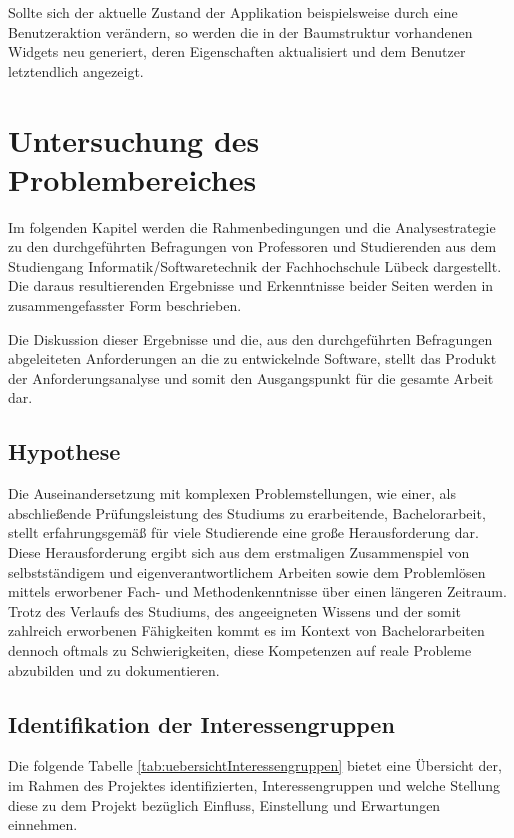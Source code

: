 \documentclass[bibliography=totoc,listof=totoc,BCOR=5mm,DIV=12,oneside]{scrbook}
\begin{document}
\par Sollte sich der aktuelle Zustand der Applikation beispielsweise durch eine Benutzeraktion verändern, so werden die in der Baumstruktur vorhandenen Widgets neu generiert, deren Eigenschaften aktualisiert und dem Benutzer letztendlich angezeigt.


\newpage
\chapter{Untersuchung des Problembereiches} \label{chap:problemanalyse}
\par Im folgenden Kapitel werden die Rahmenbedingungen und die Analysestrategie zu den durchgeführten Befragungen von Professoren und Studierenden aus dem Studiengang Informatik/Softwaretechnik der Fachhochschule Lübeck dargestellt. Die daraus resultierenden Ergebnisse und Erkenntnisse beider Seiten werden in zusammengefasster Form beschrieben. 
\par Die Diskussion dieser Ergebnisse und die, aus den durchgeführten Befragungen abgeleiteten Anforderungen an die zu entwickelnde Software, stellt das Produkt der Anforderungsanalyse und somit den Ausgangspunkt für die gesamte Arbeit dar.

\section{Hypothese}
\par Die Auseinandersetzung mit komplexen Problemstellungen, wie einer, als abschließende Prüfungsleistung des Studiums zu erarbeitende, Bachelorarbeit, stellt erfahrungsgemäß für viele Studierende eine große Herausforderung dar. Diese Herausforderung ergibt sich aus dem erstmaligen Zusammenspiel von selbstständigem und eigenverantwortlichem Arbeiten sowie dem Problemlösen mittels erworbener Fach- und Methodenkenntnisse über einen längeren Zeitraum.
Trotz des Verlaufs des Studiums, des angeeigneten Wissens und der somit zahlreich erworbenen Fähigkeiten kommt es im Kontext von Bachelorarbeiten dennoch oftmals zu Schwierigkeiten, diese Kompetenzen auf reale Probleme abzubilden und zu dokumentieren.

\newpage
\section{Identifikation der Interessengruppen}
\par Die folgende Tabelle \ref{tab:uebersichtInteressengruppen} bietet eine Übersicht der, im Rahmen des Projektes identifizierten, Interessengruppen und welche Stellung diese zu dem Projekt bezüglich Einfluss, Einstellung und Erwartungen einnehmen.
\end{document}
